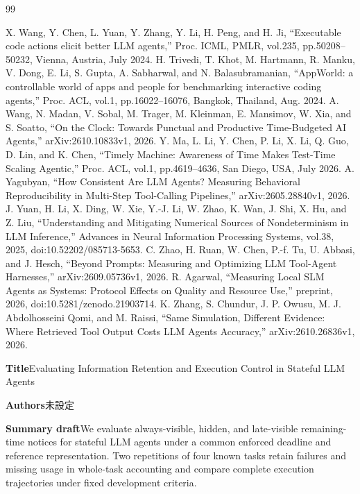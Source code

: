 \documentclass[uplatex,a4paper,twocolumn,10pt]{jsarticle}
\begin{document}
\begin{thebibliography}{99}
\raggedright
{} X. Wang, Y. Chen, L. Yuan, Y. Zhang, Y. Li, H. Peng, and H. Ji, ``Executable code actions elicit better LLM agents,'' Proc. ICML, PMLR, vol.235, pp.50208--50232, Vienna, Austria, July 2024.
 H. Trivedi, T. Khot, M. Hartmann, R. Manku, V. Dong, E. Li, S. Gupta, A. Sabharwal, and N. Balasubramanian, ``AppWorld: a controllable world of apps and people for benchmarking interactive coding agents,'' Proc. ACL, vol.1, pp.16022--16076, Bangkok, Thailand, Aug. 2024.
 A. Wang, N. Madan, V. Sobal, M. Trager, M. Kleinman, E. Mansimov, W. Xia, and S. Soatto, ``On the Clock: Towards Punctual and Productive Time-Budgeted AI Agents,'' arXiv:2610.10833v1, 2026.
 Y. Ma, L. Li, Y. Chen, P. Li, X. Li, Q. Guo, D. Lin, and K. Chen, ``Timely Machine: Awareness of Time Makes Test-Time Scaling Agentic,'' Proc. ACL, vol.1, pp.4619--4636, San Diego, USA, July 2026.
 A. Yagubyan, ``How Consistent Are LLM Agents? Measuring Behavioral Reproducibility in Multi-Step Tool-Calling Pipelines,'' arXiv:2605.28840v1, 2026.
 J. Yuan, H. Li, X. Ding, W. Xie, Y.-J. Li, W. Zhao, K. Wan, J. Shi, X. Hu, and Z. Liu, ``Understanding and Mitigating Numerical Sources of Nondeterminism in LLM Inference,'' Advances in Neural Information Processing Systems, vol.38, 2025, doi:10.52202/085713-5653.
 C. Zhao, H. Ruan, W. Chen, P.-f. Tu, U. Abbasi, and J. Hesch, ``Beyond Prompts: Measuring and Optimizing LLM Tool-Agent Harnesses,'' arXiv:2609.05736v1, 2026.
 R. Agarwal, ``Measuring Local SLM Agents as Systems: Protocol Effects on Quality and Resource Use,'' preprint, 2026, doi:10.5281/zenodo.21903714.
 K. Zhang, S. Chundur, J. P. Owusu, M. J. Abdolhosseini Qomi, and M. Raissi, ``Same Simulation, Different Evidence: Where Retrieved Tool Output Costs LLM Agents Accuracy,'' arXiv:2610.26836v1, 2026.
\end{thebibliography}
\clearpage
\onecolumn
\noindent\textbf{Title}\quad Evaluating Information Retention and Execution Control in Stateful LLM Agents

\noindent\textbf{Authors}\quad 未設定

\noindent\textbf{Summary draft}\quad We evaluate always-visible, hidden, and late-visible remaining-time notices for stateful LLM agents under a common enforced deadline and reference representation. Two repetitions of four known tasks retain failures and missing usage in whole-task accounting and compare complete execution trajectories under fixed development criteria.
\end{document}
